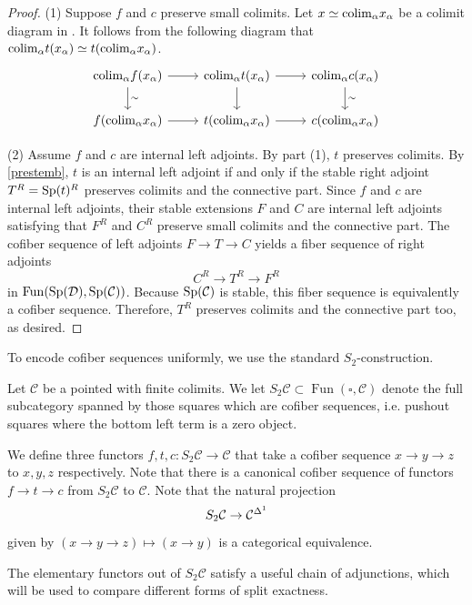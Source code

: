 \documentclass[a4paper,10pt, oneside]{amsart}
\begin{document}
\begin{proof}
	(1) Suppose $f$ and $c$ preserve small colimits. Let $x\simeq\mathrm{colim}_\alpha x_\alpha$ be a colimit diagram in \mcc. It follows from the following diagram that $\mathrm{colim}_\alpha t(x_\alpha)\simeq t(\mathrm{colim}_\alpha x_\alpha)$.
	$$\begin{tikzcd}
		\colimit_\alpha f(x_\alpha) \arrow[d, "\sim"] \arrow[r] & \colimit_\alpha t(x_\alpha) \arrow[d] \arrow[r] & \colimit_\alpha c(x_\alpha) \arrow[d, "\sim"] \\
		f(\colimit_\alpha x_\alpha) \arrow[r]                  &  t(\colimit_\alpha x_\alpha) \arrow[r]          &  c(\colimit_\alpha x_\alpha)                 
	\end{tikzcd}$$
	
	(2) Assume $f$ and $c$ are internal left adjoints. By part (1), $t$ preserves colimits. By \cref{prestemb}, $t$ is an internal left adjoint if and only if the stable right adjoint $T^R=\mathrm{Sp}(t)^R$ preserves colimits and the connective part. Since $f$ and $c$ are internal left adjoints, their stable extensions $F$ and $C$ are internal left adjoints satisfying that $F^R$ and $C^R$ preserve small colimits and the connective part. The cofiber sequence of left adjoints $F \to T \to C$ yields a fiber sequence of right adjoints $$C^R \to T^R \to F^R$$ in $\operatorname{Fun}(\operatorname{Sp}(\mathcal{D}), \operatorname{Sp}(\mathcal{C}))$. Because $\operatorname{Sp}(\mathcal{C})$ is stable, this fiber sequence is equivalently a cofiber sequence. Therefore, $T^R$ preserves colimits and the connective part too, as desired.
\end{proof}
To encode cofiber sequences uniformly, we use the standard \(S_2\)-construction.
\begin{nota}
	Let $\mathcal{C}$ be a pointed \infcat with finite colimits. We let $S_2 \mathcal{C} \subset \operatorname{Fun}(\square, \mathcal{C})$ denote the full subcategory spanned by those squares which are cofiber sequences, i.e. pushout squares where the bottom left term is a zero object. 
	
	We define three functors $f, t, c: S_2 \mathcal{C} \rightarrow \mathcal{C}$ that take a cofiber sequence $x \rightarrow y \rightarrow z$ to $x, y, z$ respectively. Note that there is a canonical cofiber sequence of functors $f \rightarrow t \rightarrow c$ from $S_2 \mathcal{C}$ to $\mathcal{C}$.  Note that the natural projection $$S_2\mathcal{C}\to\mathcal{C}^{\Delta^1}$$ given by $(x\to y\to z)\mapsto (x\to y)$ is a categorical equivalence.
\end{nota}
The elementary functors out of \(S_2\mathcal C\) satisfy a useful chain of adjunctions, which will be used to compare different forms of split exactness.
\end{document}
